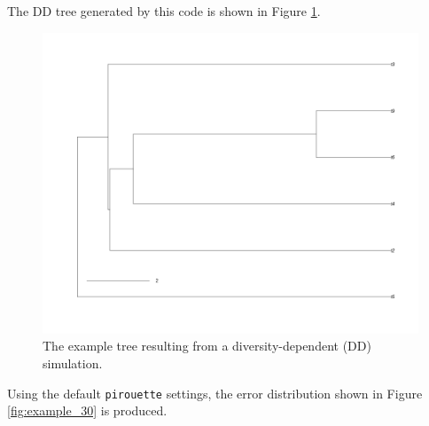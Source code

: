 The DD tree generated by this code is shown in Figure \ref{fig:dd_tree}. 

\begin{figure}[H]
  \includegraphics[width=\textwidth]{pirouette_example_30/example_30_314/true_tree.png}
  \caption{
    The example tree resulting from a diversity-dependent (DD) simulation.
  }
  \label{fig:dd_tree}
\end{figure}

Using the default \verb;pirouette; settings,
the error distribution shown in Figure \ref{fig:example_30}
is produced.

